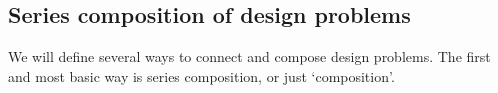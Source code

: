 %
%
%


\subsection{Series composition of design problems}

We will define several ways to connect and compose design problems. The first and most basic way is series composition, or just `composition'.

